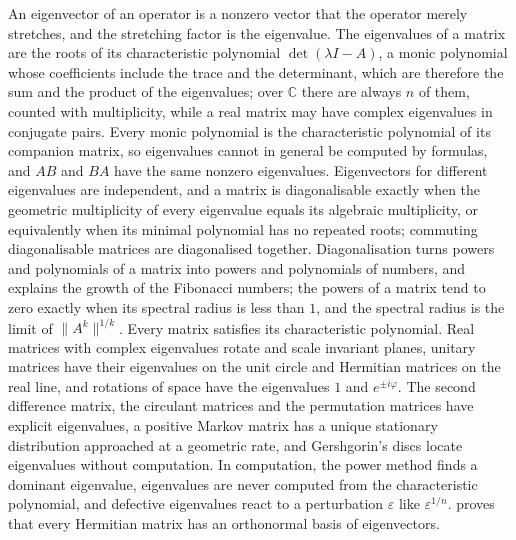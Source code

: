 \bigskip
An eigenvector of an operator is a nonzero vector that the operator merely stretches, and the stretching factor is the eigenvalue. The eigenvalues of a matrix are the roots of its characteristic polynomial $\det(\lambda I-A)$, a monic polynomial whose coefficients include the trace and the determinant, which are therefore the sum and the product of the eigenvalues; over $\mathbb C$ there are always $n$ of them, counted with multiplicity, while a real matrix may have complex eigenvalues in conjugate pairs. Every monic polynomial is the characteristic polynomial of its companion matrix, so eigenvalues cannot in general be computed by formulas, and $AB$ and $BA$ have the same nonzero eigenvalues. Eigenvectors for different eigenvalues are independent, and a matrix is diagonalisable exactly when the geometric multiplicity of every eigenvalue equals its algebraic multiplicity, or equivalently when its minimal polynomial has no repeated roots; commuting diagonalisable matrices are diagonalised together. Diagonalisation turns powers and polynomials of a matrix into powers and polynomials of numbers, and explains the growth of the Fibonacci numbers; the powers of a matrix tend to zero exactly when its spectral radius is less than $1$, and the spectral radius is the limit of $\|A^k\|^{1/k}$. Every matrix satisfies its characteristic polynomial. Real matrices with complex eigenvalues rotate and scale invariant planes, unitary matrices have their eigenvalues on the unit circle and Hermitian matrices on the real line, and rotations of space have the eigenvalues $1$ and $e^{\pm i\varphi}$. The second difference matrix, the circulant matrices and the permutation matrices have explicit eigenvalues, a positive Markov matrix has a unique stationary distribution approached at a geometric rate, and Gershgorin's discs locate eigenvalues without computation. In computation, the power method finds a dominant eigenvalue, eigenvalues are never computed from the characteristic polynomial, and defective eigenvalues react to a perturbation $\varepsilon$ like $\varepsilon^{1/n}$.  proves that every Hermitian matrix has an orthonormal basis of eigenvectors.

\chapternotes

